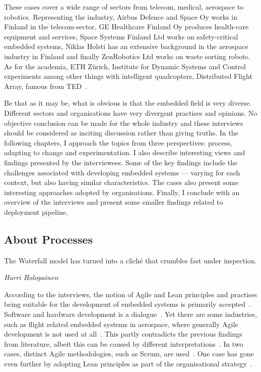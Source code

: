 \documentclass[english]{tktltiki2}
\begin{document}
These cases cover a wide range of sectors from telecom, medical, aerospace to robotics. Representing the industry, Airbus Defence and Space Oy works in Finland in the telecom-sector, GE Healthcare Finland Oy produces health-care equipment and services, Space Systems Finland Ltd works on safety-critical embedded systems, Niklas Holsti has an extensive background in the aerospace industry in Finland and finally ZenRobotics Ltd works on waste sorting robots. As for the academia, ETH Zürich, Institute for Dynamic Systems and Control experiments among other things with intelligent quadcopters, Distributed Flight Array, famous from TED~\cite{Dan13}.

Be that as it may be, what is obvious is that the embedded field is very diverse. Different sectors and organisations have very divergent practises and opinions. No objective conclusion can be made for the whole industry and these interviews should be considered as inciting discussion rather than giving truths. In the following chapters, I approach the topics from three perspectives: process, adapting to change and experimentation. I also describe interesting views and findings presented by the interviewees. Some of the key findings include the challenges associated with developing embedded systems — varying for each context, but also having similar characteristics. The cases also present some interesting approaches adopted by organisations. Finally, I conclude with an overview of the interviews and present some smaller findings related to deployment pipeline.

\subsection{About Processes}

\epigraph{The Waterfall model has turned into a cliché that crumbles fast under inspection.}{\textit{Harri Holopainen~\cite{Hol15a}}}

According to the interviews, the notion of Agile and Lean principles and practises being suitable for the development of embedded systems is primarily accepted~\cite{Hol15a, Koi15, Kri15, Pet15}. Software and hardware development is a dialogue~\cite{BT15}. Yet there are some industries, such as flight related embedded systems in aerospace, where generally Agile development is not used at all~\cite{Hol15b}. This partly contradicts the previous findings from literature, albeit this can be caused by different interpretations~\cite{LB03}. In two cases, distinct Agile methodologies, such as Scrum, are used~\cite{BT15, Pet15}. One case has gone even further by adopting Lean principles as part of the organisational strategy~\cite{BT15}.
\end{document}
